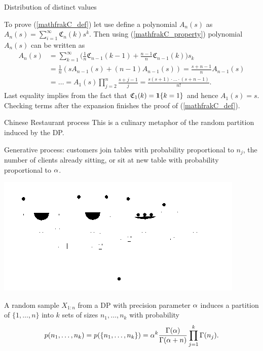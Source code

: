 \begin{frame}{Distribution of distinct values}

To prove (\ref{mathfrakC_def}) let use define a polynomial $A_n(s)$ as $A_n(s) = \sum_{i=1}^\infty \mathfrak{C}_n(k)s^k$. Then using (\ref{mathfrakC_property}) polynomial $A_n(s)$ can be written as
\begin{equation*}
\begin{split}
    A_n(s)&=\sum_{k=1}^\infty \bigg(  \frac 1n \mathfrak{C}_{n-1}(k-1)+\frac{n-1}{n}\mathfrak{C}_{n-1}(k)   \bigg) s_k\\
    &=\frac{1}{n}( s A_{n-1}(s) +(n-1) A_{n-1}(s) )=\frac{s+n-1}{n}A_{n-1}(s)\\
    &=\ldots=A_1(s)\prod_{j=2}^n\frac{s+j-1}{j}=\frac{s(s+1)\cdot\ldots\cdot(s+n-1)}{n!}.
\end{split}
\end{equation*}
Last equality implies from the fact that $\mathfrak{C}_1(k)=\mathbf 1\{k=1\}$ and hence $A_1(s)=s$. Checking terms after the expansion finishes the proof of (\ref{mathfrakC_def}).


\end{frame}

\begin{frame}{Chinese Restaurant process}
This is a culinary metaphor of the \alert{random partition} induced by the DP. 

\alert{Generative process}: customers join tables with probability proportional to \alert{$n_j$}, the number of clients already sitting, or sit at \alert{new table} with probability  proportional to \alert{$\alpha$}.
\begin{center}
	\includegraphics[width = .5\textwidth]{figures_julyan/intro_DP/CRP}
\end{center}

\begin{proposition}
A random sample $X_{1:n}$ from a DP with precision parameter $\alpha$ induces a partition of $\{1,\ldots,n\}$ into $k$ sets of sizes $n_1,\ldots,n_k$ with probability 
\begin{equation*}
    p(n_1,\ldots,n_k)=p(\{n_1,\ldots,n_k\})=\alpha^k\frac{\Gamma(\alpha)}{\Gamma(\alpha+n)}\prod_{j=1}^k\Gamma (n_j).
\end{equation*}
\end{proposition}

\end{frame}

